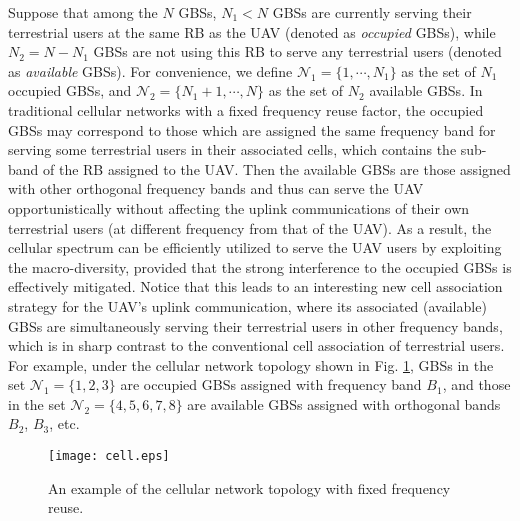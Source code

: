 \documentclass[onecolumn, draftclsnofoot, 12pt]{IEEEtran}
\begin{document}
Suppose that among the $N$ GBSs, $N_1<N$ GBSs are currently serving their terrestrial users at the same RB as the UAV (denoted as \emph{occupied} GBSs), while $N_2=N-N_1$ GBSs are not using this RB to serve any terrestrial users (denoted as \emph{available} GBSs). For convenience, we define $\mathcal{N}_1=\{1,\cdots,N_1\}$ as the set of $N_1$ occupied GBSs, and $\mathcal{N}_2=\{N_1+1,\cdots,N\}$ as the set of $N_2$ available GBSs. In traditional cellular networks with a fixed frequency reuse factor, the occupied GBSs may correspond to those which are assigned the same frequency band for serving some terrestrial users in their associated cells, which contains the sub-band of the RB assigned to the UAV. Then  the available GBSs are those assigned with other orthogonal frequency bands and thus can serve the UAV opportunistically without affecting the uplink communications of their own terrestrial users (at different frequency from that of the UAV). As a result, the cellular spectrum can be efficiently utilized to serve the UAV users by exploiting the macro-diversity, provided that the strong interference to the occupied GBSs is effectively mitigated. Notice that this leads to an interesting new cell association strategy for the UAV's uplink communication, where its associated (available) GBSs are simultaneously serving their terrestrial users in other frequency bands, which is in sharp contrast to the conventional cell association of terrestrial users. For example, under the cellular network topology shown in Fig. \ref{cell}, GBSs in the set $\mathcal{N}_1=\{1,2,3\}$ are occupied GBSs assigned with frequency band $B_1$, and those in the set $\mathcal{N}_2=\{4,5,6,7,8\}$ are available GBSs assigned with orthogonal bands $B_2$, $B_3$, etc.



\begin{figure}
\begin{center}
\texttt{[image: cell.eps]}
\end{center}
\vspace{-5mm}
\caption{An example of the cellular network topology with fixed frequency reuse.}\label{cell}
\vspace{-7mm}
\end{figure}
\end{document}
